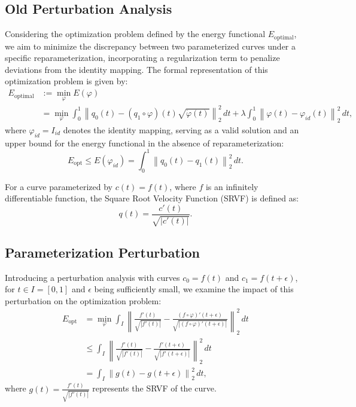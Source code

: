 
\subsection{Old Perturbation Analysis}

Considering the optimization problem defined by the energy functional $E_{\mathrm{optimal}}$, we aim to minimize the discrepancy between two parameterized curves under a specific reparameterization, incorporating a regularization term to penalize deviations from the identity mapping. The formal representation of this optimization problem is given by:
\begin{equation}
    \begin{aligned}
        E_{\mathrm{optimal}} 
        &:= \min_{\varphi} E(\varphi) \\
        &= \min_{\varphi} \int_0^1 \left\| q_0(t) - (q_1 \circ \varphi)(t) \sqrt{\dot{\varphi}(t)} \right\|_2^2 \, dt + \lambda \int_0^1 \left\|\varphi(t) - \varphi_{id}(t) \right\|_2^2 \, dt,
    \end{aligned}
\end{equation}
where $\varphi_{id} = I_{id}$ denotes the identity mapping, serving as a valid solution and an upper bound for the energy functional in the absence of reparameterization:
\begin{equation}
    E_{\mathrm{opt}} \leq E(\varphi_{id}) = \int_0^1 \left\| q_0(t) - q_1(t) \right\|_2^2 \, dt.
\end{equation}

For a curve parameterized by $c(t) = f(t)$, where $f$ is an infinitely differentiable function, the Square Root Velocity Function (SRVF) is defined as:
\begin{equation*}
    q(t) = \frac{{c'(t)}}{\sqrt{|{c'(t)}|}}.
\end{equation*}

\subsection{Parameterization Perturbation}

Introducing a perturbation analysis with curves $c_0 = f(t)$ and $c_1 = f(t + \epsilon)$, for $t \in I = [0, 1]$ and $\epsilon$ being sufficiently small, we examine the impact of this perturbation on the optimization problem:
\begin{equation}
    \begin{aligned}
        E_{\mathrm{opt}} 
        &= \min_{\varphi} \int_I \left\| \frac{f'(t)}{\sqrt{|f'(t)|}} - \frac{(f \circ \varphi)'(t + \epsilon)}{\sqrt{|(f \circ \varphi)'(t + \epsilon)|}} \right\|_2^2 \, dt \\
        &\leq \int_I \left\| \frac{f'(t)}{\sqrt{|f'(t)|}} - \frac{f'(t + \epsilon)}{\sqrt{|f'(t + \epsilon)|}} \right\|_2^2 \, dt \\
        &= \int_I \left\| g(t) - g(t + \epsilon) \right\|_2^2 \, dt,
    \end{aligned}
\end{equation}
where $g(t) = \frac{f'(t)}{\sqrt{|f'(t)|}}$ represents the SRVF of the curve.

